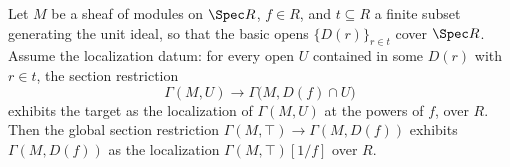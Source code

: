 

\begin{lemma}
  \label{lem:section_localization_descent_of_cover}
  \leanok
  Let \(M\) be a sheaf of modules on \(\Spec R\), \(f \in R\), and
  \(t \subseteq R\) a finite subset generating the unit ideal, so that the basic opens
  \(\{D(r)\}_{r \in t}\) cover \(\Spec R\). Assume the localization datum: for every open
  \(U\) contained in some \(D(r)\) with \(r \in t\), the section restriction
  \[
    \Gamma(M, U) \longrightarrow \Gamma\bigl(M, D(f) \cap U\bigr)
  \]
  exhibits the target as the localization of \(\Gamma(M, U)\) at the powers of \(f\),
  over \(R\). Then the global section restriction
  \(\Gamma(M, \top) \to \Gamma(M, D(f))\) exhibits \(\Gamma(M, D(f))\) as the
  localization \(\Gamma(M, \top)[1/f]\) over \(R\).
\end{lemma}

